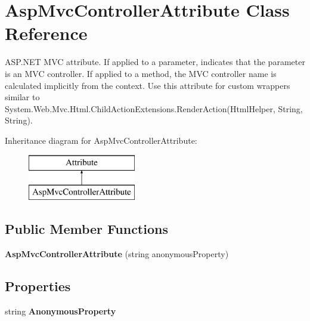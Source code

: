 \hypertarget{class_asp_mvc_controller_attribute}{}\section{Asp\+Mvc\+Controller\+Attribute Class Reference}
\label{class_asp_mvc_controller_attribute}


A\+S\+P.\+N\+E\+T M\+V\+C attribute. If applied to a parameter, indicates that the parameter is an M\+V\+C controller. If applied to a method, the M\+V\+C controller name is calculated implicitly from the context. Use this attribute for custom wrappers similar to {\ttfamily System.\+Web.\+Mvc.\+Html.\+Child\+Action\+Extensions.\+Render\+Action(\+Html\+Helper, String, String)}.  


Inheritance diagram for Asp\+Mvc\+Controller\+Attribute\+:\begin{figure}[H]
\begin{center}
\leavevmode
\includegraphics[height=2.000000cm]{class_asp_mvc_controller_attribute}
\end{center}
\end{figure}
\subsection*{Public Member Functions}
\begin{DoxyCompactItemize}
\item 
\hypertarget{class_asp_mvc_controller_attribute_a4e9eab92ec92d827df192a85b653f463}{}{\bfseries Asp\+Mvc\+Controller\+Attribute} (string anonymous\+Property)\label{class_asp_mvc_controller_attribute_a4e9eab92ec92d827df192a85b653f463}

\end{DoxyCompactItemize}
\subsection*{Properties}
\begin{DoxyCompactItemize}
\item 
\hypertarget{class_asp_mvc_controller_attribute_adb49d7099fe6a2366db45aca2e3488ab}{}string {\bfseries Anonymous\+Property}\label{class_asp_mvc_controller_attribute_adb49d7099fe6a2366db45aca2e3488ab}

\end{DoxyCompactItemize}


